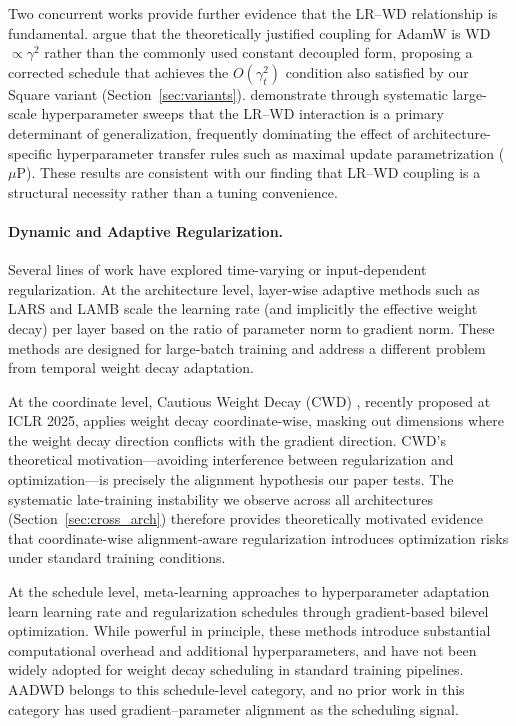\documentclass{article}
\begin{document}
Two concurrent works provide further evidence that the LR--WD relationship is
fundamental.
\citet{chen2025correction} argue that the theoretically justified coupling for AdamW
is WD $\propto \gamma^2$ rather than the commonly used constant decoupled form,
proposing a corrected schedule that achieves the $O(\gamma_t^2)$ condition also
satisfied by our Square variant (Section~\ref{sec:variants}).
\citet{malladi2025weight} demonstrate through systematic large-scale hyperparameter
sweeps that the LR--WD interaction is a primary determinant of generalization,
frequently dominating the effect of architecture-specific hyperparameter transfer
rules such as maximal update parametrization ($\mu$P).
These results are consistent with our finding that LR--WD coupling is a structural
necessity rather than a tuning convenience.

\paragraph{Dynamic and Adaptive Regularization.}
Several lines of work have explored time-varying or input-dependent regularization.
At the architecture level, layer-wise adaptive methods such as LARS \citep{you2017large}
and LAMB \citep{you2020large} scale the learning rate (and implicitly the effective
weight decay) per layer based on the ratio of parameter norm to gradient norm.
These methods are designed for large-batch training and address a different problem
from temporal weight decay adaptation.

At the coordinate level, Cautious Weight Decay (CWD) \citep{liu2025cautious},
recently proposed at ICLR 2025, applies weight decay coordinate-wise, masking out
dimensions where the weight decay direction conflicts with the gradient direction.
CWD's theoretical motivation---avoiding interference between regularization and
optimization---is precisely the alignment hypothesis our paper tests.
The systematic late-training instability we observe across all architectures
(Section~\ref{sec:cross_arch}) therefore provides theoretically motivated evidence
that coordinate-wise alignment-aware regularization introduces optimization risks
under standard training conditions.

At the schedule level, meta-learning approaches to hyperparameter adaptation
\citep{baydin2018online, franceschi2018bilevel} learn learning rate and regularization
schedules through gradient-based bilevel optimization.
While powerful in principle, these methods introduce substantial computational
overhead and additional hyperparameters, and have not been widely adopted for weight
decay scheduling in standard training pipelines.
AADWD belongs to this schedule-level category, and no prior work in this category
has used gradient--parameter alignment as the scheduling signal.
\end{document}
